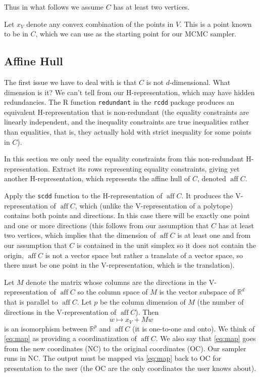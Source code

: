 \documentclass[11pt]{article}
\DeclareMathOperator{\aff}{aff}
\newcommand{\real}{\mathbb{R}}
\begin{document}
Thus in what follows we assume $C$ has at least two vertices.

Let $x_V$ denote any convex combination of the points in $V$.
This is a point known to be in $C$, which we can use as the starting
point for our MCMC sampler.

\subsection{Affine Hull}

The first issue we have to deal with is that $C$ is not $d$-dimensional.
What dimension is it?  We can't tell from our H-representation, which may
have hidden redundancies.  The R function \texttt{redundant}
in the \texttt{rcdd} package produces an equivalent H-representation that
is non-redundant (the equality constraints are linearly independent,
and the inequality constraints are true inequalities rather than equalities,
that is, they actually hold with strict inequality for some points in $C$).

In this section we only need the equality constraints from
this non-redundant H-representation.  Extract its rows
representing equality constraints, giving yet another H-representation,
which represents the affine hull of $C$, denoted $\aff C$.

Apply the \texttt{scdd} function to the H-representation of $\aff C$.
It produces the V-representation of $\aff C$, which (unlike the
V-representation of a polytope) contains both points and directions.
In this case there will be exactly one point and one or more directions
(this follows from our assumption that $C$ has at least two vertices,
which implies that the dimension of $\aff C$ is at least one and from
our assumption that $C$ is contained in the unit simplex so it does
not contain the origin, $\aff C$ is not a vector space but rather a
translate of a vector space, so there must be one point in the
V-representation, which is the translation).

Let $M$ denote the matrix whose columns are the directions in the
V-representation of $\aff C$ so the column space of $M$ is the vector
subspace of $\real^d$ that is parallel to $\aff C$.  Let $p$ be the
column dimension of $M$ (the number of directions in the V-representation
of $\aff C$).  Then
\begin{equation} \label{eq:map}
   w \mapsto x_V + M w
\end{equation}
is an isomorphism between $\real^p$ and $\aff C$ (it is one-to-one and onto).
We think of \eqref{eq:map} as providing a coordinatization of $\aff C$.
We also say that \eqref{eq:map} goes from the new coordinates (NC) to
the original coordinates (OC).  Our sampler runs in NC.  The output
must be mapped via \eqref{eq:map} back to OC for presentation to the user
(the OC are the only coordinates the user knows about).
\end{document}
